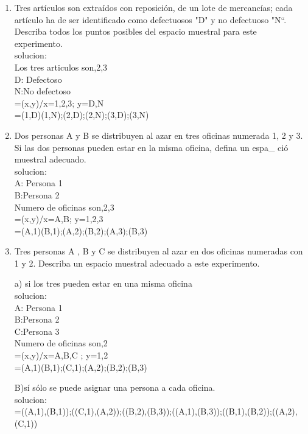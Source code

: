 \documentclass[13pt,a4paper]{article}
\begin{document}
\begin{enumerate}
\item  Tres artículos son extraídos con reposición, de un lote de mercancías; cada artículo ha de ser identificado como defectuosos "D" y no defectuoso "N“. Describa todos los puntos posibles del espacio muestral para este experimento.\\[0.1cm] 
solucion:\\[0.1cm]
Los tres articulos son,2,3\rbrace\\[0.1cm] 
D: Defectoso\\[0.1cm]
N:No defectoso\\[0.1cm]
\Omega=\lbrace(x,y)/x=1,2,3; y=D,N \rbrace\\[0.1cm] 
\Omega=\lbrace(1,D)(1,N);(2,D);(2,N);(3,D);(3,N) \rbrace\\[0.1cm]

\item Dos personas A y B se distribuyen al azar en tres oficinas numerada 1, 2 y 3. Si las dos personas pueden estar en la misma oficina, defina un espa_ ció muestral adecuado.\\[0.1cm] 
solucion:\\[0.1cm]
A: Persona 1\\[0.1cm]
B:Persona 2\\[0.1cm] 
Numero de oficinas  son,2,3\rbrace\\[0.1cm] 
\Omega=\lbrace(x,y)/x=A,B; y=1,2,3 \rbrace\\[0.1cm] 
\Omega=\lbrace(A,1)(B,1);(A,2);(B,2);(A,3);(B,3) \rbrace\\[0.1cm]


\item  Tres personas A , B y C se distribuyen al azar en dos oficinas numeradas con 1 y 2. Describa un espacio muestral adecuado a este experimento.
\begin{enumerate}a) si los tres pueden estar en una misma oficina\\[0.1cm]
solucion:\\[0.1cm]
A: Persona 1\\[0.1cm]
B:Persona 2\\[0.1cm] 
C:Persona 3\\[0.1cm] 
Numero de oficinas  son,2\rbrace\\[0.1cm] 
\Omega=\lbrace(x,y)/x=A,B,C ; y=1,2 \rbrace\\[0.1cm] 
\Omega=\lbrace(A,1)(B,1);(C,1);(A,2);(B,2);(B,3) \rbrace\\[0.1cm] 

\end{enumerate}
\begin{enumerate}B)sí sólo se puede asignar una persona a cada oficina.\\[0.1cm] 
solucion:\\[0.1cm] 
\Omega=\lbrace((A,1),(B,1));((C,1),(A,2));((B,2),(B,3));((A,1),(B,3));((B,1),(B,2));((A,2),(C,1)) \rbrace\\[0.1cm] 
\end{enumerate}


\end{enumerate}
\end{document}

